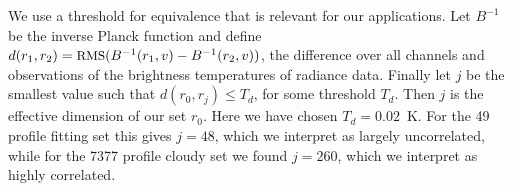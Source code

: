 \documentclass[11pt]{article}
\begin{document}
We use a threshold for equivalence that is relevant for our
applications.  Let $B^{-1}$ be the inverse Planck function and
define $d(r_1, r_2) = \mbox{\small RMS}(B^{-1}(r_1, v) - B^{-1}(r_2, v))$, the
{\rms} difference over all channels and observations of the
brightness temperatures of radiance data.  Finally let $j$ be the
smallest value such that $d(r_0, r_j) \le T_d$, for some threshold
$T_d$.  Then $j$ is the effective dimension of our set $r_0$.  Here
we have chosen $T_d = 0.02$~K.  For the 49 profile fitting set this
gives $j=48$, which we interpret as largely uncorrelated, while for
the 7377 profile cloudy set we found $j=260$, which we interpret as
highly correlated.

\FloatBarrier


\end{document}
